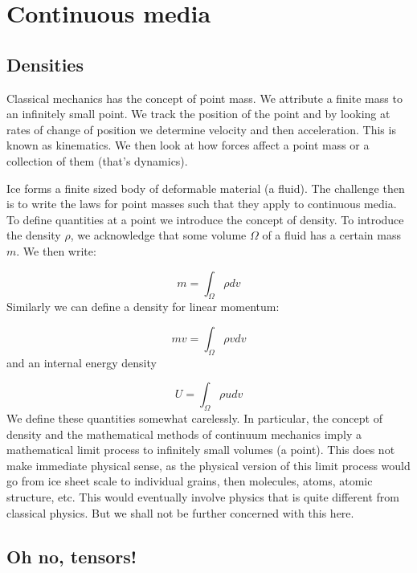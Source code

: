 \documentclass[12pt, openany]{memoir}
\begin{document}
\section{Continuous media}

\subsection{Densities}

Classical mechanics has the concept of point mass. We attribute a
finite mass to an infinitely small point. We track the position of the
point and by looking at rates of change of position we determine
velocity and then acceleration. This is known as kinematics. We then
look at how forces affect a point mass or a collection of them (that's
dynamics).

Ice forms a finite sized body of deformable material (a fluid). The challenge
then is to write the laws for point masses such that they apply to
continuous media. To define quantities at a point we introduce the
concept of density. To introduce the density $\rho$, we acknowledge that some
volume $\Omega$ of a fluid has a certain mass $m$. We then write:

\begin{equation}
m = \int_\Omega \rho dv
\end{equation}
Similarly we can define a density for linear momentum:

\begin{equation}
m v = \int_\Omega \rho v dv
\end{equation}
and an internal energy density 

\begin{equation}
U = \int_\Omega \rho u dv 
\end{equation}
We define these quantities somewhat carelessly. In particular, the
concept of density and the mathematical methods of continuum mechanics
imply a mathematical limit process to infinitely small volumes (a
point). This does not make immediate physical sense, as the physical
version of this limit process would go from ice sheet scale to
individual grains, then molecules, atoms, atomic structure, etc. This
would eventually involve physics that is quite different from
classical physics. But we shall not be further concerned with this here.

\subsection{Oh no, tensors!}
\end{document}
